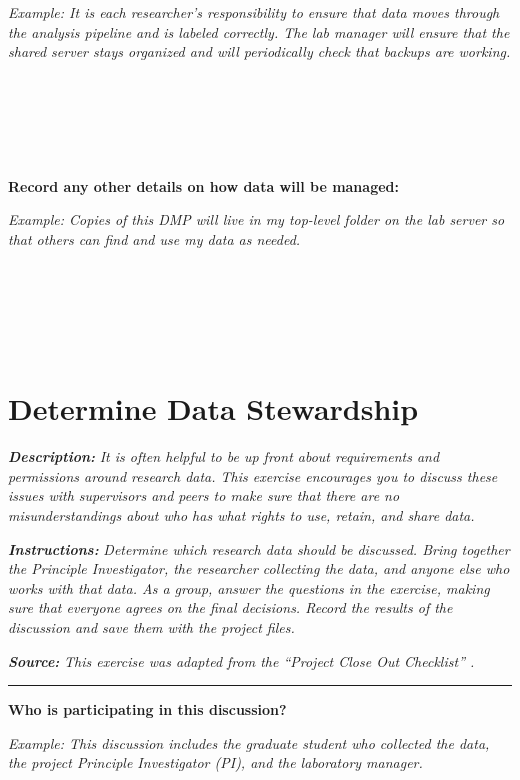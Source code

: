 \documentclass[
]{book}
\begin{document}
\emph{Example: It is each researcher's responsibility to ensure that data moves through the analysis pipeline and is labeled correctly. The lab manager will ensure that the shared server stays organized and will periodically check that backups are working.}

~

~

~

\textbf{Record any other details on how data will be managed:}

\emph{Example: Copies of this DMP will live in my top-level folder on the lab server so that others can find and use my data as needed.}

~

~

~

\newpage

\hypertarget{data-governance}{%
\section{Determine Data Stewardship}\label{data-governance}}

\textbf{\emph{Description:}} \emph{It is often helpful to be up front about requirements and permissions around research data. This exercise encourages you to discuss these issues with supervisors and peers to make sure that there are no misunderstandings about who has what rights to use, retain, and share data.}

\textbf{\emph{Instructions:}} \emph{Determine which research data should be discussed. Bring together the Principle Investigator, the researcher collecting the data, and anyone else who works with that data. As a group, answer the questions in the exercise, making sure that everyone agrees on the final decisions. Record the results of the discussion and save them with the project files.}

\textbf{\emph{Source:}} \emph{This exercise was adapted from the ``Project Close Out Checklist'' \citep{briney_project_2020}.}

\begin{center}\rule{0.5\linewidth}{0.5pt}\end{center}

\textbf{Who is participating in this discussion?}

\emph{Example: This discussion includes the graduate student who collected the data, the project Principle Investigator (PI), and the laboratory manager.}
\end{document}

